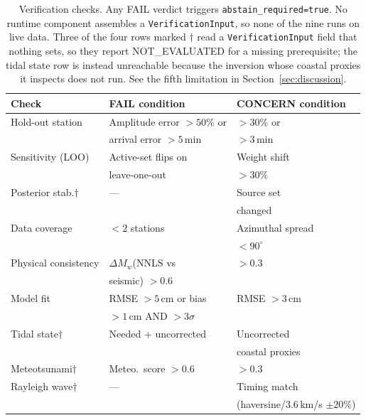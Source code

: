 \documentclass{article}
\begin{document}
\begin{table}[t]
\centering
\caption{Verification checks. Any FAIL verdict triggers
  \texttt{abstain\_required=true}. No runtime component assembles a
  \texttt{VerificationInput}, so none of the nine runs on live data.
  Three of the four rows marked $\dagger$ read a
  \texttt{VerificationInput} field that nothing sets, so they report
  NOT\_EVALUATED for a missing prerequisite; the tidal state row is instead
  unreachable because the inversion whose coastal proxies it inspects does
  not run.
  See the fifth limitation in Section~\ref{sec:discussion}.}
\label{tab:verification}
\begin{tabular}{lll}
\toprule
Check & FAIL condition & CONCERN condition \\
\midrule
Hold-out station     & Amplitude error $>50\%$ or   & $>30\%$ or     \\
                     & arrival error $>5$\,min        & $>3$\,min      \\
Sensitivity (LOO)    & Active-set flips on           & Weight shift   \\
                     & leave-one-out                  & $>30\%$        \\
Posterior stab.$\dagger$ & ---                       & Source set     \\
                     &                               & changed        \\
Data coverage        & $<2$ stations                 & Azimuthal spread \\
                     &                               & $<90^\circ$    \\
Physical consistency & $\Delta M_w$(NNLS vs            & $> 0.3$        \\
                     & seismic) $> 0.6$              &                \\
Model fit            & RMSE $> 5$\,cm or bias        & RMSE $> 3$\,cm \\
                     & $> 1$\,cm AND $> 3\sigma$     &                \\
Tidal state$\dagger$ & Needed + uncorrected          & Uncorrected    \\
                     &                               & coastal proxies\\
Meteotsunami$\dagger$ & Meteo.\ score $> 0.6$        & $> 0.3$        \\
Rayleigh wave$\dagger$ & ---                         & Timing match   \\
                     &                               & (haversine/$3.6$\,km/s $\pm 20\%$)\\
\bottomrule
\end{tabular}
\end{table}
\end{document}
